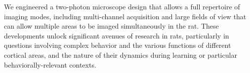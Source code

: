 We engineered a two-photon microscope design that allows a full repertoire of imaging modes, including multi-channel acquisition and large fields of view that can allow multiple areas to be imaged simultaneously in the rat. These developments unlock significant avenues of research in rats, particularly in questions involving complex behavior and the various functions of different cortical areas, and the nature of their dynamics during learning or particular behaviorally-relevant contexts. 






